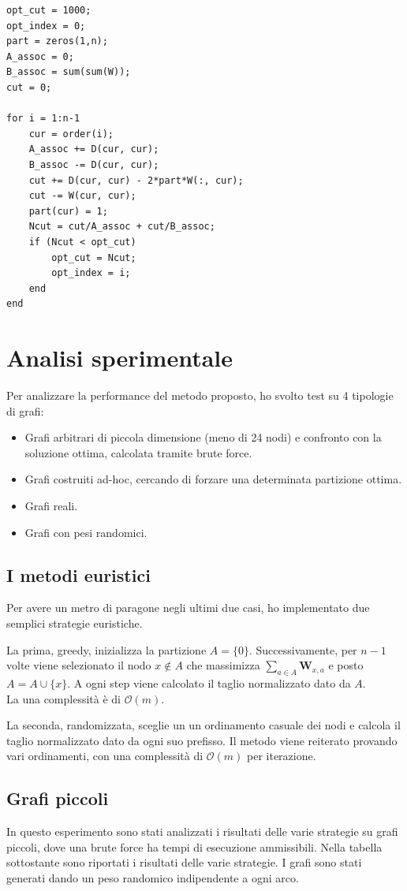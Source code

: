 \documentclass{article}
\newcommand{\W}{\mathbf{W}}
\begin{document}
\begin{lstlisting}[style=Matlab-editor]
opt_cut = 1000;
opt_index = 0;
part = zeros(1,n);
A_assoc = 0;
B_assoc = sum(sum(W));
cut = 0;

for i = 1:n-1
    cur = order(i);
    A_assoc += D(cur, cur);
    B_assoc -= D(cur, cur);
    cut += D(cur, cur) - 2*part*W(:, cur);
    cut -= W(cur, cur);
    part(cur) = 1;
    Ncut = cut/A_assoc + cut/B_assoc;
    if (Ncut < opt_cut)
        opt_cut = Ncut;
        opt_index = i;
    end
end
\end{lstlisting}


\section{Analisi sperimentale}

Per analizzare la performance del metodo proposto, ho svolto test su 4 tipologie di grafi:
\begin{itemize}
    \item Grafi arbitrari di piccola dimensione (meno di 24 nodi) e confronto con la soluzione ottima, calcolata tramite brute force.
    \item Grafi costruiti ad-hoc, cercando di forzare una determinata partizione ottima.
    \item Grafi reali.
    \item Grafi con pesi randomici.
\end{itemize}

\subsection{I metodi euristici}
Per avere un metro di paragone negli ultimi due casi, ho implementato due semplici strategie euristiche.\\
\par
La prima, greedy, inizializza la partizione $A = \{0\}$. Successivamente, per $n-1$ volte viene selezionato il nodo $x \notin A$ che massimizza $\sum_{a \in A} \W_{x,a}$ e posto $A = A \cup \{x\}$.
A ogni step viene calcolato il taglio normalizzato dato da $A$.\\
La una complessit\`a \`e di $\mathcal{O}(m)$.
\par
La seconda, randomizzata, sceglie un un ordinamento casuale dei nodi e calcola il taglio normalizzato dato da ogni suo prefisso.
Il metodo viene reiterato provando vari ordinamenti, con una complessit\`a di $\mathcal{O}(m)$ per iterazione.

\subsection{Grafi piccoli}
In questo esperimento sono stati analizzati i risultati delle varie strategie
su grafi piccoli, dove una brute force ha tempi di esecuzione ammissibili.
Nella tabella sottostante sono riportati i risultati delle varie strategie.
I grafi sono stati generati dando un peso randomico indipendente a ogni arco.
\end{document}
